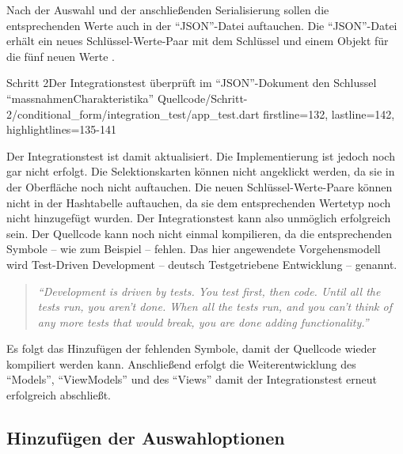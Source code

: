 Nach der Auswahl und der anschließenden Serialisierung sollen die entsprechenden Werte auch in der \enquote{JSON}-Datei auftauchen.
Die \enquote{JSON}-Datei erhält ein neues Schlüssel-Werte-Paar mit dem Schlüssel  und einem Objekt für die fünf neuen Werte .

\begin{alexlisting}{Schritt 2}{Der Integrationstest überprüft im \enquote{JSON}-Dokument den Schlussel \enquote{massnahmenCharakteristika}}
  {Quellcode/Schritt-2/conditional_form/integration_test/app_test.dart}
  {firstline=132, lastline=142, highlightlines={135-141}}
  \label{lst:Schritt2ExpectedJson}
\end{alexlisting}

Der Integrationstest ist damit aktualisiert.
Die Implementierung ist jedoch noch gar nicht erfolgt.
Die Selektionskarten können nicht angeklickt werden, da sie in der Oberfläche noch nicht auftauchen.
Die neuen Schlüssel-Werte-Paare können nicht in der Hashtabelle auftauchen, da sie dem entsprechenden Wertetyp noch nicht hinzugefügt wurden.
Der Integrationstest kann also unmöglich erfolgreich sein.
Der Quellcode kann noch nicht einmal kompilieren, da die entsprechenden Symbole -- wie zum Beispiel  -- fehlen.
Das hier angewendete Vorgehensmodell wird Test-Driven Development -- deutsch Testgetriebene Entwicklung -- genannt.
 


\begin{quotation}
\textit{\enquote{Development is driven by tests.
You test first, then code.
Until all the tests run, you aren't
done.
When all the tests run, and you can't think of any more tests that would break, you
are done adding functionality.}}


\end{quotation}

Es folgt das Hinzufügen der fehlenden Symbole, damit der Quellcode wieder kompiliert werden kann.
Anschließend erfolgt die Weiterentwicklung des \enquote{Models}, \enquote{ViewModels} und des \enquote{Views} damit der Integrationstest erneut erfolgreich abschließt.


\subsection{Hinzufügen der Auswahloptionen}

